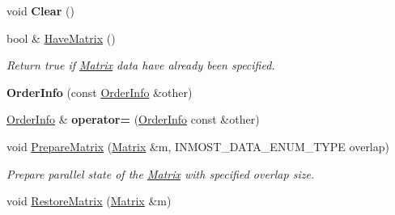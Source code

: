 \begin{DoxyCompactItemize}
\item 
\hypertarget{classINMOST_1_1Solver_1_1OrderInfo_a39cb3da0f477eebc9742377ab0e451cc}{void {\bfseries Clear} ()}\label{classINMOST_1_1Solver_1_1OrderInfo_a39cb3da0f477eebc9742377ab0e451cc}

\item 
\hypertarget{classINMOST_1_1Solver_1_1OrderInfo_a7a2e4998859c13bd156d40ab02c4d099}{bool \& \hyperlink{classINMOST_1_1Solver_1_1OrderInfo_a7a2e4998859c13bd156d40ab02c4d099}{Have\-Matrix} ()}\label{classINMOST_1_1Solver_1_1OrderInfo_a7a2e4998859c13bd156d40ab02c4d099}

\begin{DoxyCompactList}\small\item\em Return true if \hyperlink{classINMOST_1_1Solver_1_1Matrix}{Matrix} data have already been specified. \end{DoxyCompactList}\item 
\hypertarget{classINMOST_1_1Solver_1_1OrderInfo_a85ac0fe0f430301dab083aff8e241873}{{\bfseries Order\-Info} (const \hyperlink{classINMOST_1_1Solver_1_1OrderInfo}{Order\-Info} \&other)}\label{classINMOST_1_1Solver_1_1OrderInfo_a85ac0fe0f430301dab083aff8e241873}

\item 
\hypertarget{classINMOST_1_1Solver_1_1OrderInfo_a3d57307d3179f786d8a6fdc4948bc03b}{\hyperlink{classINMOST_1_1Solver_1_1OrderInfo}{Order\-Info} \& {\bfseries operator=} (\hyperlink{classINMOST_1_1Solver_1_1OrderInfo}{Order\-Info} const \&other)}\label{classINMOST_1_1Solver_1_1OrderInfo_a3d57307d3179f786d8a6fdc4948bc03b}

\item 
void \hyperlink{classINMOST_1_1Solver_1_1OrderInfo_a24d9af6294ae5f25d3eec4b7833108b6}{Prepare\-Matrix} (\hyperlink{classINMOST_1_1Solver_1_1Matrix}{Matrix} \&m, I\-N\-M\-O\-S\-T\-\_\-\-D\-A\-T\-A\-\_\-\-E\-N\-U\-M\-\_\-\-T\-Y\-P\-E overlap)
\begin{DoxyCompactList}\small\item\em Prepare parallel state of the \hyperlink{classINMOST_1_1Solver_1_1Matrix}{Matrix} with specified overlap size. \end{DoxyCompactList}\item 
\hypertarget{classINMOST_1_1Solver_1_1OrderInfo_ac56c713ddc7621e7125ef4ffe50ae281}{void \hyperlink{classINMOST_1_1Solver_1_1OrderInfo_ac56c713ddc7621e7125ef4ffe50ae281}{Restore\-Matrix} (\hyperlink{classINMOST_1_1Solver_1_1Matrix}{Matrix} \&m)}\label{classINMOST_1_1Solver_1_1OrderInfo_ac56c713ddc7621e7125ef4ffe50ae281}


\end{DoxyCompactItemize}
